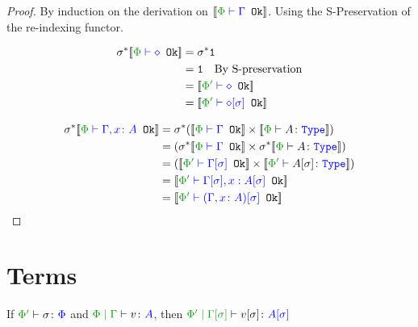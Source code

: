 \documentclass{report}
\begin{document}
\begin{framed}
    \begin{proof}
        By induction on the derivation on $\deno{\wellformedok{\P}{\G}}$. Using the S-Preservation of the re-indexing functor.
        
        \case{\envnil}
        \begin{align*}
            \si\star\deno{\wellformedok{\P}{\nil}} &=\si\star\1\\
            & = \1\qt{By S-preservation}\\
            &= \deno{\wellformedok{\P'}{\nil}}\\
            &= \deno{\wellformedok{\P'}{\nil\ssi}}\\
        \end{align*}
        
        \case{\envextend}
        \begin{align*}
           \si\star\deno{\wellformedok{\P}{\gax}} &= \si\star(\deno{\wellformedok{\P}{\G}} \times \deno{\typerelation{\P}{A}{\type}}) \\
           & = (\si\star\deno{\wellformedok{\P}{\G}} \times \si\star\deno{\typerelation{\P}{A}{\type}})\\
            & = (\deno{\wellformedok{\P'}{\G\ssi}} \times \deno{\typerelation{\P'}{A\ssi}{\type}})\\
            & = \deno{\wellformedok{\P'}{\G\ssi, x: A\ssi}}\\
            & = \deno{\wellformedok{\P'}{(\gax)\ssi}}\\
        \end{align*}
    \end{proof}
\end{framed}



\section{Terms}
\begin{theorem}
    If $\typerelation{\P'}{\si}{\P}$ and $\gpetyperelation{v}{A}$, then $\etyperelation{\P'}{\G\ssi}{v\ssi}{A\ssi}$ 
\end{theorem}
\end{document}
